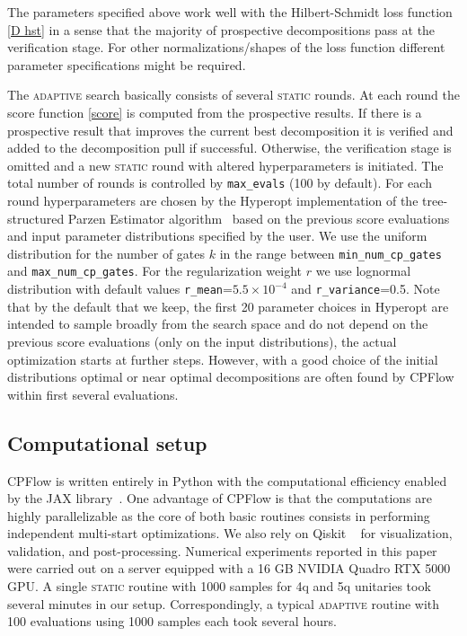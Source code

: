 \documentclass[draft, twocolumn, amsfonts, amssymb, aps, nofootinbib]{revtex4-2}
\newcommand{\package}[1]{\textrm {#1 }}
\newcommand{\cpflow}{\package{CPFlow}}
\newcommand{\static}{\textsc{static }}
\newcommand{\adaptive}{\textsc{adaptive }}
\newcommand{\param}[1]{\texttt{#1}}
\begin{document}
The parameters specified above work well with the Hilbert-Schmidt loss function \eqref{D hst} in a sense that the majority of prospective decompositions pass at the verification stage. For other normalizations/shapes of the loss function different parameter specifications might be required.

The \adaptive search basically consists of several \static rounds. At each round the score function \eqref{score}  is computed from the prospective results. If there is a prospective result that improves the current best decomposition it is verified and added to the decomposition pull if successful. Otherwise, the verification stage is omitted and a new \static round with altered hyperparameters is initiated. The total number of rounds is controlled by \param{max\_evals} (100 by default). For each round hyperparameters are chosen by the \package{Hyperopt} implementation of the tree-structured Parzen Estimator algorithm~\cite{hyperopt} based on the previous score evaluations and input parameter distributions specified by the user. We use the uniform distribution for the number of gates $k$ in the range between \param{min\_num\_cp\_gates} and \param{max\_num\_cp\_gates}. For the regularization weight $r$ we use lognormal distribution with default values \param{r\_mean}=$5.5\times10^{-4}$ and \param{r\_variance}=0.5. Note that by the default that we keep, the first 20 parameter choices in Hyperopt are intended to sample broadly from the search space and do not depend on the previous score evaluations (only on the input distributions), the actual optimization starts at further steps. However, with a good choice of the initial distributions optimal or near optimal decompositions are often found by \cpflow within first several evaluations.
\subsection{Computational setup \label{server}}
\cpflow is written entirely in Python with the computational efficiency enabled by the \package{JAX} library~\cite{jax2018github}. One advantage of \cpflow is that the computations are highly parallelizable as the core of both basic routines consists in performing independent multi-start optimizations. We also rely on \package{Qiskit}~\cite{Qiskit} for visualization, validation, and post-processing. Numerical experiments reported in this paper  were carried out on a server equipped with a 16 GB NVIDIA Quadro RTX 5000 GPU. A single \static routine with 1000 samples for 4q and 5q unitaries took several minutes in our setup.  Correspondingly, a typical \adaptive routine with 100 evaluations using 1000 samples each took several hours.
\end{document}
